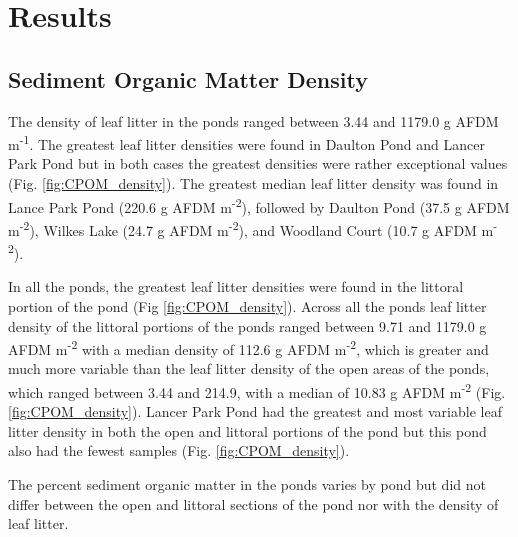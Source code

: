 \section{Results}
\subsection{Sediment Organic Matter Density}

The density of leaf litter in the ponds ranged between 3.44 and 1179.0 g AFDM m\textsuperscript{-1}. The greatest leaf litter densities were found in Daulton Pond and Lancer Park Pond but in both cases the greatest densities were rather exceptional values (Fig. \ref{fig:CPOM_density}). The greatest median leaf litter density was found in Lance Park Pond (220.6 g AFDM m\textsuperscript{-2}), followed by Daulton Pond (37.5 g AFDM m\textsuperscript{-2}), Wilkes Lake (24.7 g AFDM m\textsuperscript{-2}), and Woodland Court (10.7 g AFDM m\textsuperscript{-2}). 

In all the ponds, the greatest leaf litter densities were found in the littoral portion of the pond (Fig \ref{fig:CPOM_density}). Across all the ponds leaf litter density of the littoral portions of the ponds ranged between 9.71 and 1179.0 g AFDM m\textsuperscript{-2} with a median density of 112.6 g AFDM m\textsuperscript{-2}, which is greater and much more variable than the leaf litter density of the open areas of the ponds, which ranged between 3.44 and 214.9, with a median of 10.83 g AFDM m\textsuperscript{-2} (Fig. \ref{fig:CPOM_density}). Lancer Park Pond had the greatest and most variable leaf litter density in both the open and littoral portions of the pond but this pond also had the fewest samples (Fig. \ref{fig:CPOM_density}). 

The percent sediment organic matter in the ponds varies by pond but did not differ between the open and littoral sections of the pond nor with the density of leaf litter.

  

  
